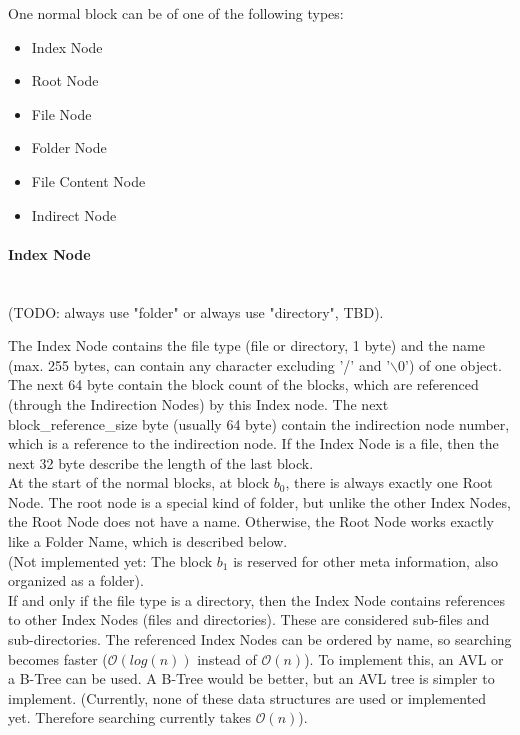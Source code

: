 \documentclass[JCDReport.tex]{subfiles}
\begin{document}
\noindent One normal block can be of one of the following types:

\begin{itemize}
  \item Index Node
    \item Root Node
    \item File Node
    \item Folder Node
  \item File Content Node
  \item Indirect Node
\end{itemize}

\paragraph{Index Node} ~\\

(TODO: always use "folder" or always use "directory", TBD).

The Index Node contains the file type (file or directory, 1 byte) and the name (max. 255 bytes, can contain any character excluding '/' and '$\backslash0$') of one object. The next 64 byte contain the block count of the blocks, which are referenced  (through the Indirection Nodes) by this Index node. The next block\_reference\_size byte (usually 64 byte) contain the indirection node number, which is a reference to the indirection node. If the Index Node is a file, then the next 32 byte describe the length of the last block.\\


At the start of the normal blocks, at block $b_{0}$, there is always exactly one Root Node. The root node is a special kind of folder, but unlike the other Index Nodes, the Root Node does not have a name. Otherwise, the Root Node works exactly like a Folder Name, which is described below.\\

(Not implemented yet: The block $b_{1}$ is reserved for other meta information, also organized as a folder).\\

If and only if the file type is a directory, then the Index Node contains references to other Index Nodes (files and directories). These are considered sub-files and sub-directories. The referenced Index Nodes can be ordered by name, so searching becomes faster ($\mathcal{O}(log(n))$ instead of $\mathcal{O}(n)$). To implement this, an AVL or a B-Tree can be used. A B-Tree would be better, but an AVL tree is simpler to implement. (Currently, none of these data structures are used or implemented yet. Therefore searching currently takes $\mathcal{O}(n)$).\\
\end{document}
